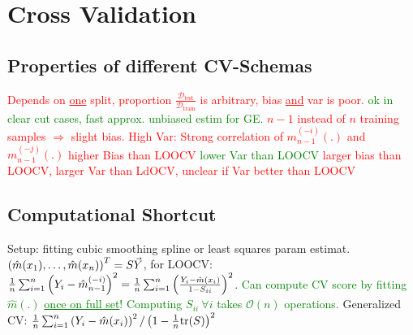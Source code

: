 \section{Cross Validation}

\vspace{-5pt}

\subsection{Properties of different CV-Schemas}

 \textcolor{red}{Depends on \underline{one} split, proportion $\frac{\mathcal{D}_{\text{test}}}{\mathcal{D}_{\text{train}}}$ is arbitrary, bias \underline{and} var is poor.} \textcolor{green}{ok in clear cut cases, fast}
 \textcolor{green}{approx. unbiased estim for GE.} \textcolor{red}{$n-1$ instead of $n$ training samples $\Rightarrow$ slight bias. High Var: Strong correlation of $m_{n-1}^{(-i)}(.)$ and $m_{n-1}^{(-j)}(.)$}
 \textcolor{red}{higher Bias than LOOCV} \textcolor{green}{lower Var than LOOCV}
 \textcolor{red}{larger bias than LOOCV, larger Var than LdOCV, unclear if Var better than LOOCV}

\vspace{-5pt}

\subsection{Computational Shortcut}
Setup: fitting cubic smoothing spline or least squares param estimat. $\left( \hat{m}(x_1),\dots,\hat{m}(x_n) \right)^T = S \vec{Y}$, for LOOCV: $\frac{1}{n} \sum_{i=1}^n \left( Y_i - \hat{m}_{n-1}^{(-i)} \right)^2 = \frac{1}{n} \sum_{i=1}^n \left( \frac{Y_i - \hat{m}(x_i)}{1-S_{ii}} \right)^2$. \textcolor{green}{Can compute CV score by fitting $\hat{m}(.)$ \underline{once on full set}! Computing $S_{ii} \ \forall i$ takes $\mathcal{O}(n)$ operations.} Generalized CV: $\frac{1}{n} \sum_{i=1}^n \left( Y_i - \hat{m}(x_i) \right)^2 / \left( 1 - \frac{1}{n} \text{tr}(S) \right)^2$
